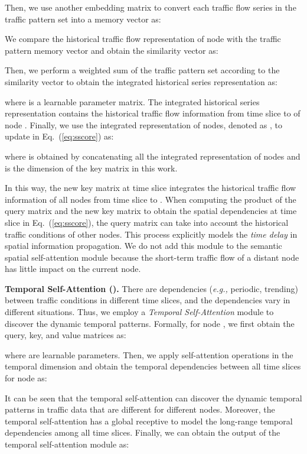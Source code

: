 \documentclass[letterpaper]{article} \usepackage{aaai23}  \usepackage{times}  \usepackage{helvet}  \usepackage{courier}  \usepackage[hyphens]{url}  \usepackage{graphicx} \urlstyle{rm} \def\UrlFont{\rm}  \usepackage{natbib}  \usepackage{caption} \frenchspacing  \setlength{\pdfpagewidth}{8.5in} \setlength{\pdfpageheight}{11in} \usepackage{algorithm}
\newcommand{\paratitle}[1]{\vspace{1.5ex}\noindent\textbf{#1}}
\newcommand{\eg}{\emph{e.g.,}\xspace}
\newcommand{\tsa}{\xspace}
\begin{document}
Then, we use another embedding matrix  to convert each traffic flow series in the traffic pattern set  into a memory vector as:

We compare the historical traffic flow representation  of node  with the traffic pattern memory vector  and obtain the similarity vector as:

Then, we perform a weighted sum of the traffic pattern set  according to the similarity vector  to obtain the integrated historical series representation  as:

where  is a learnable parameter matrix. The integrated historical series representation  contains the historical traffic flow information from time slice  to  of node . Finally, we use the integrated representation of  nodes, denoted as , to update  in Eq.~(\ref{eq:sscore}) as:

where  is obtained by concatenating all the integrated representation  of  nodes and  is the dimension of the key matrix in this work.



In this way, the new key matrix  at time slice  integrates the historical traffic flow information of all nodes from time slice  to . When computing the product of the query matrix and the new key matrix to obtain the spatial dependencies  at time slice  in Eq.~(\ref{eq:sscore}), the query matrix can take into account the historical traffic conditions of other nodes. This process explicitly models the \emph{time delay} in spatial information propagation. We do not add this module to the semantic spatial self-attention module because the short-term traffic flow of a distant node has little impact on the current node.



\paratitle{Temporal Self-Attention (\tsa).} There are dependencies (\eg periodic, trending) between traffic conditions in different time slices, and the dependencies vary in different situations. Thus, we employ a \emph{Temporal Self-Attention} module to discover the dynamic temporal patterns. Formally, for node , we first obtain the query, key, and value matrices as: 

where  are learnable parameters. Then, we apply self-attention operations in the temporal dimension and obtain the temporal dependencies between all time slices for node  as:

It can be seen that the temporal self-attention can discover the dynamic temporal patterns in traffic data that are different for different nodes. Moreover, the temporal self-attention has a global receptive to model the long-range temporal dependencies among all time slices. Finally, we can obtain the output of the temporal self-attention module as:
\end{document}
